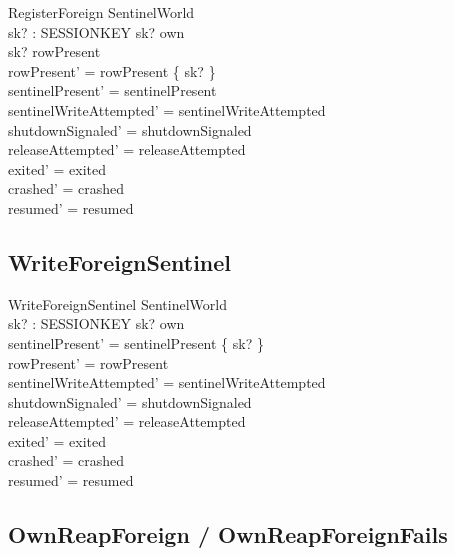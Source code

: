 \documentclass[a4paper,10pt,fleqn]{article}
\begin{document}
\begin{schema}{RegisterForeign}
  \Delta SentinelWorld \\
  sk? : SESSIONKEY
  \where
  sk? \neq own \\
  sk? \notin rowPresent \\
  rowPresent' = rowPresent \cup \{ sk? \} \\
  sentinelPresent' = sentinelPresent \\
  sentinelWriteAttempted' = sentinelWriteAttempted \\
  shutdownSignaled' = shutdownSignaled \\
  releaseAttempted' = releaseAttempted \\
  exited' = exited \\
  crashed' = crashed \\
  resumed' = resumed
\end{schema}

\subsection{WriteForeignSentinel}

\begin{schema}{WriteForeignSentinel}
  \Delta SentinelWorld \\
  sk? : SESSIONKEY
  \where
  sk? \neq own \\
  sentinelPresent' = sentinelPresent \cup \{ sk? \} \\
  rowPresent' = rowPresent \\
  sentinelWriteAttempted' = sentinelWriteAttempted \\
  shutdownSignaled' = shutdownSignaled \\
  releaseAttempted' = releaseAttempted \\
  exited' = exited \\
  crashed' = crashed \\
  resumed' = resumed
\end{schema}

\subsection{OwnReapForeign / OwnReapForeignFails}
\end{document}
